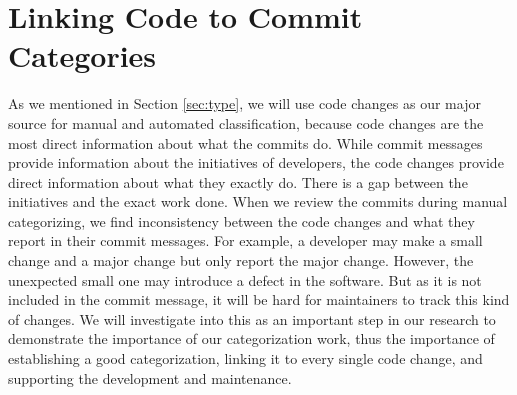 \section{Linking Code to Commit Categories}
\label{sec:pattern}
As we mentioned in Section \ref{sec:type}, we will use code changes as our major source for manual and automated classification, because code changes are the most direct information about what the commits do.
While commit messages provide information about the initiatives of developers, the code changes provide direct information about what they exactly do.
There is a gap between the initiatives and the exact work done.
When we review the commits during manual categorizing, we find inconsistency between the code changes and what they report in their commit messages.
For example, a developer may make a small change and a major change but only report the major change. 
However, the unexpected small one may introduce a defect in the software. 
But as it is not included in the commit message, it will be hard for maintainers to track this kind of changes.
We will investigate into this as an important step in our research to demonstrate the importance of our categorization work, thus the importance of establishing a good categorization, linking it to every single code change, and supporting the development and maintenance.

